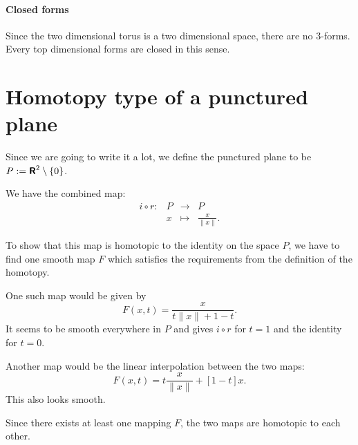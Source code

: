 \documentclass[11pt, english, fleqn, DIV=15, headinclude, BCOR=1cm]{scrartcl}
\begin{document}
\paragraph{Closed forms}

Since the two dimensional torus is a two dimensional space, there are no
3-forms. Every top dimensional forms are closed in this sense.

\section{Homotopy type of a punctured plane}
\label{homework:3}

Since we are going to write it a lot, we define the punctured plane to be $P :=
\text{\bfseries\sffamily R}^2 \setminus \{ 0 \}$.

We have the combined map:
\[
    \begin{matrix}
        i \circ r \colon & P & \to & P \\
    & x & \mapsto & \frac{x}{\| x \|}.
    \end{matrix}
\]

To show that this map is homotopic to the identity on the space $P$, we have to
find one smooth map $F$ which satisfies the requirements from the definition of
the homotopy.

One such map would be given by
\[
    F(x, t) = \frac{x}{t \| x \| + 1 - t}.
\]
It seems to be smooth everywhere in $P$ and gives $i \circ r$ for $t = 1$ and
the identity for $t = 0$.

Another map would be the linear interpolation between the two maps:
\[
    F(x, t) = t \frac{x}{\| x \|} + [1-t] x.
\]
This also looks smooth.

Since there exists at least one mapping $F$, the two maps are homotopic to each
other.
\end{document}
